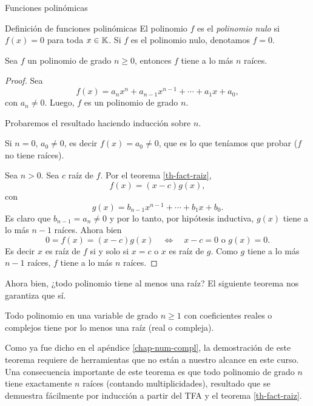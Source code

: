 \begin{chapter}{Funciones polinómicas}
\begin{section}{Definición de funciones polinómicas}
    El polinomio $f$ es el \textit{polinomio nulo} si $f(x)=0$ para toda $x \in \mathbb K$. Si $f$ es el polinomio nulo,  denotamos $f =0$.

    \begin{teorema}\label{th-pol-raiz}
        Sea $f$ un polinomio de grado $n \ge 0$, entonces $f$ tiene a lo  más  $n$ raíces.
    \end{teorema}
    \begin{proof}
        Sea
        \begin{equation*}
            f(x) = a_nx^n + a_{n-1}x^{n-1}+\cdots + a_1x +a_0,
        \end{equation*}
        con $a_n \ne 0$. Luego,  $f$ es un polinomio de grado $n$.

        Probaremos el resultado haciendo inducción sobre $n$.

        Si $n=0$, $a_0 \ne 0$, es decir  $f(x)=a_0\ne 0$, que es lo que teníamos que probar ($f$ no tiene raíces).


        Sea $n>0$. Sea $c$ raíz de $f$. Por  el teorema \ref{th-fact-raiz},
        \begin{equation*}
            f(x) = (x-c)g(x),
        \end{equation*}
        con
        \begin{equation*}
            g(x) = b_{n-1}x^{n-1} + \cdots + b_1x +b_0.
        \end{equation*}
        Es claro que $b_{n-1} = a_n \ne 0$ y por lo tanto, por hipótesis inductiva, $g(x)$ tiene a lo más $n-1$ raíces. Ahora bien
        \begin{equation*}
            0 =f(x) = (x-c)g(x) \quad \Leftrightarrow \quad x-c=0 \text{ o } g(x) =0.
        \end{equation*}
        Es decir $x$ es raíz de $f$ si y solo si $x=c$ o $x$ es raíz de $g$. Como $g$ tiene a lo más $n-1$ raíces,  $f$ tiene a lo más $n$ raíces.
    \end{proof}

    Ahora bien, ¿todo polinomio tiene al menos una raíz? El siguiente teorema nos garantiza que sí.

    \begin{teorema}
        Todo polinomio en una variable de grado $n\ge 1$ con coeficientes reales o complejos tiene por lo menos una raíz (real o compleja).
    \end{teorema}

    Como ya fue dicho en el apéndice \ref{chap-num-compl}, la demostración de este teorema requiere de herramientas que no están a nuestro alcance en este curso. Una consecuencia importante de este teorema es que todo polinomio de grado $n$ tiene exactamente $n$ raíces (contando multiplicidades), resultado que se demuestra fácilmente por inducción a partir del TFA y el teorema \ref{th-fact-raiz}.


\end{section}
\end{chapter}
